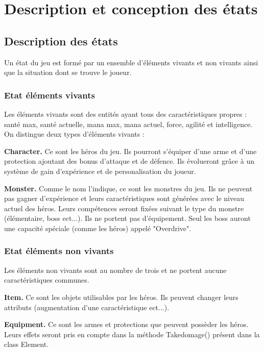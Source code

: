 \documentclass[12pt,a4paper]{report}
\begin{document}
\chapter{Description et conception des \'{e}tats}
\section{Description des \'{e}tats}

Un \'{e}tat du jeu est form\'{e} par un ensemble d'\'{e}l\'{e}ments vivants et non vivants ainsi que la situation dont se trouve le joueur.

\subsection{Etat \'{e}l\'{e}ments vivants}

Les \'{e}l\'{e}ments vivants sont des entit\'{e}s ayant tous des caract\'{e}ristiques propres : santé max, santé actuelle, mana max, mana actuel, force, agilit\'{e} et intelligence.
On distingue deux types d'\'{e}l\'{e}ments vivants :

\textbf{Character.} Ce sont les h\'{e}ros du jeu. Ils pourront s'\'{e}quiper d'une arme et d'une protection ajoutant des bonus d'attaque et de d\'{e}fence. Ils \'{e}volueront grâce \`{a} un syst\`{e}me de gain d'exp\'{e}rience et de personalisation du joueur.  

\textbf{Monster.} Comme le nom l'indique, ce sont les monstres du jeu. Ils ne peuvent pas gagner d'exp\'{e}rience et leurs caract\'{e}ristiques sont g\'{e}n\'{e}r\'{e}es avec le niveau actuel des h\'{e}ros. Leurs comp\'{e}tences seront fix\'{e}es suivant le type du monstre (\'{e}l\'{e}mentaire, boss ect...). Ils ne portent pas d'\'{e}quipement. Seul les boss auront une capacit\'{e} sp\'{e}ciale (comme les h\'{e}ros) appel\'{e} "Overdrive".

\subsection{Etat \'{e}l\'{e}ments non vivants}

Les \'{e}l\'{e}ments non vivants sont au nombre de trois et ne portent aucune caract\'{e}ristiques communes. 

\textbf{Item.} Ce sont les objets utilisables par les h\'{e}ros. Ils peuvent changer leurs attributs (augmentation d'une caract\'{e}ristique ect...).

\textbf{Equipment.} Ce sont les armes et protections que peuvent poss\`{e}der les h\'{e}ros. Leurs effets seront pris en compte dans la m\'{e}thode Takedomage() présent dans la class Element.   
\end{document}
